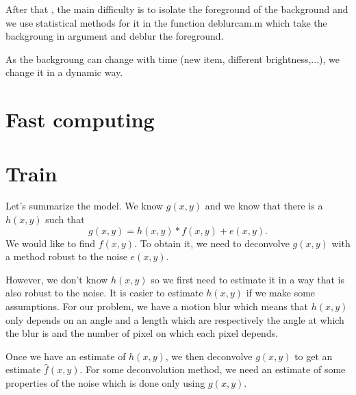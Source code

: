 After that , the main difficulty is to isolate the foreground of the background and we use statistical methods for it in the function deblurcam.m which take the backgroung in argument and deblur the foreground.

As the backgroung can change with time (new item, different brightness,...), we change it in a dynamic way.

\section{Fast computing}

\section{Train}
Let's summarize the model.
We know $g(x,y)$ and we know that there is a $h(x,y)$ such that
\[ g(x,y) = h(x,y) * f(x,y) + e(x,y). \]
We would like to find $f(x,y)$.
To obtain it, we need to deconvolve $g(x,y)$ with a method
robust to the noise $e(x,y)$.

However, we don't know $h(x,y)$ so we first need to estimate it
in a way that is also robust to the noise.
It is easier to estimate $h(x,y)$ if we make some assumptions.
For our problem, we have a motion blur which means that
$h(x,y)$ only depends on an angle and a length which are
respectively the angle at which the blur is and the number of
pixel on which each pixel depends.

Once we have an estimate of $h(x,y)$, we then deconvolve
$g(x,y)$ to get an estimate $\hat{f}(x,y)$.
For some deconvolution method, we need an estimate of
some properties of the noise which is done only using $g(x,y)$.

